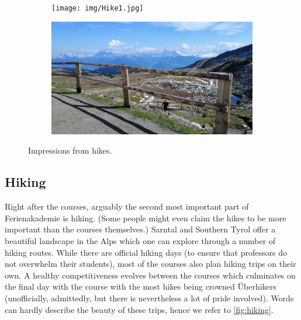 \begin{figure}[ht]%
	\centering
    \begin{subfigure}[t]{0.5\textwidth}
 	\begin{center}%
 		\texttt{[image: img/Hike1.jpg]}%
 	\end{center}%
    \end{subfigure}%
    \begin{subfigure}[t]{0.5\textwidth}
 	\begin{center}%
 		\includegraphics[scale=0.05]{img/Hike2.jpg}%
 	\end{center}%
    \end{subfigure}
    \caption{Impressions from hikes.}
    \label{fig:hiking}
\end{figure}
\subsection{Hiking}
Right after the courses, arguably the second most important part of Ferienakademie is hiking. (Some people might even claim the hikes to be more important than the courses themselves.) Sarntal and Southern Tyrol offer a beautiful landscape in the Alps which one can explore through a number of hiking routes. While there are official hiking days (to ensure that professors do not overwhelm their students), most of the courses also plan hiking trips on their own. A healthy competitiveness evolves between the courses which culminates on the final day with the course with the most hikes being crowned \"Uberhikers (unofficially, admittedly, but there is nevertheless a lot of pride involved). Words can hardly describe the beauty of these trips, hence we refer to \autoref{fig:hiking}.

